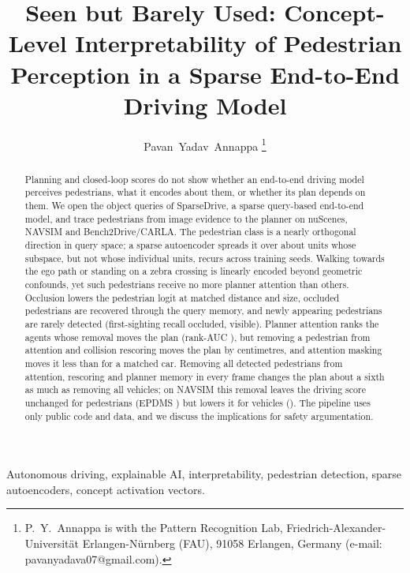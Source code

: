 \documentclass[journal]{IEEEtran}
\begin{document}
\title{Seen but Barely Used: Concept-Level Interpretability of Pedestrian Perception in a Sparse End-to-End Driving Model}

\author{Pavan~Yadav~Annappa%
\thanks{P.~Y.~Annappa is with the Pattern Recognition Lab, Friedrich-Alexander-Universit\"at Erlangen-N\"urnberg (FAU), 91058 Erlangen, Germany (e-mail: pavanyadava07@gmail.com).}}


\maketitle

\begin{abstract}
Planning and closed-loop scores do not show whether an end-to-end driving model perceives pedestrians, what it
encodes about them, or whether its plan depends on them. We open the object queries of SparseDrive, a sparse
query-based end-to-end model, and trace pedestrians from image evidence to the planner on nuScenes, NAVSIM and
Bench2Drive/CARLA. The pedestrian class is a nearly orthogonal direction in query space; a sparse autoencoder spreads
it over about \NpedUnits{} units whose subspace, but not whose individual units, recurs across training seeds.
Walking towards the ego path or standing on a zebra crossing is linearly encoded beyond geometric confounds, yet such
pedestrians receive no more planner attention than others. Occlusion lowers the pedestrian logit at matched distance
and size, occluded pedestrians are recovered through the query memory, and newly appearing pedestrians are rarely
detected (first-sighting recall \FanOccZero{} occluded, \FanVisZero{} visible). Planner attention ranks the agents
whose removal moves the plan (rank-AUC \AucAttn), but removing a pedestrian from attention and collision rescoring
moves the plan by centimetres, and attention masking moves it less than for a matched car. Removing all detected
pedestrians from attention, rescoring and planner memory in every frame changes the plan about a sixth as much as
removing all vehicles; on NAVSIM this removal leaves the driving score unchanged for pedestrians (EPDMS \NavDPeds) but
lowers it for vehicles (\NavDVehicles). The pipeline uses only public code and data, and we discuss the implications for
safety argumentation.
\end{abstract}

\begin{IEEEkeywords}
Autonomous driving, explainable AI, interpretability, pedestrian detection, sparse autoencoders, concept activation vectors.
\end{IEEEkeywords}
\end{document}
